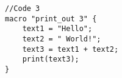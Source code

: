 \begin{lstlisting}
//Code 3
macro "print_out 3" {
	text1 = "Hello";
	text2 = " World!";
	text3 = text1 + text2;
	print(text3);
}



\end{lstlisting}
